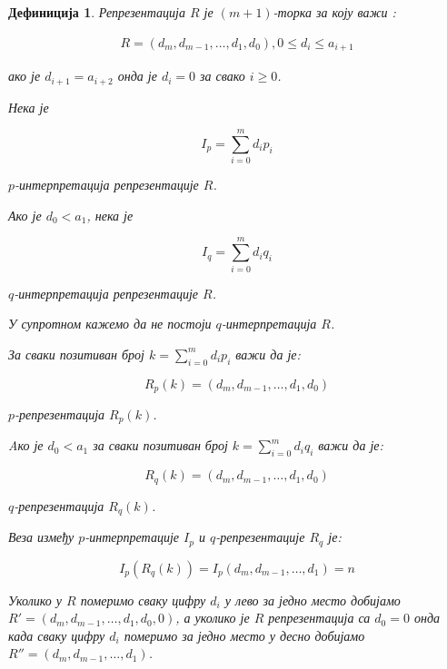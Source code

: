 \documentclass[a4paper]{article}
\newtheorem{definition}{Дефиниција}
\begin{document}
\begin{definition}
	Репрезентација $ R $ је  $ (m+1) $-торка за коју важи :

		\begin{eqnarray}
			R = (d_{m}, d_{m-1}, \dots , d_{1}, d_{0}), 0 \le d_{i} \le a_{i+1}
		\end{eqnarray}

	ако је $ d_{i+1} = a_{i+2} $ онда је $ d_{i} = 0 $ за свако $ i \ge 0 $.

	Нека је 
	
		\begin{displaymath}
			I_{p} = \sum_{i=0}^{m} d_{i}p_{i}
		\end{displaymath} 		
	
	$ p $-интерпретација репрезентације $ R $. 
	
	Ако је $ d_{0} < a_{1} $, нека је 
	
		\begin{displaymath}
			I_{q} = \sum_{i=0}^{m} d_{i}q_{i}
		\end{displaymath}  
	
	$ q $-интерпретација репрезентације $ R $. 
	
	У супротном кажемо да не постоји $ q $-интерпретација $ R $.
	
	За сваки позитиван број $ k = \sum_{i=0}^{m} d_{i}p_{i} $ важи да је: 
	
		\begin{displaymath}
			R_{p}(k) = (d_{m}, d_{m-1}, \dots , d_{1}, d_{0})
		\end{displaymath}
	
	$ p $-репрезентација $ R_{p}(k) $.
	
	Aко је $ d_{0} < a_{1} $ за сваки позитиван број $ k = \sum_{i=0}^{m} d_{i}q_{i} $ важи да је:
	
		\begin{displaymath}
			R_{q}(k) = (d_{m}, d_{m-1}, \dots , d_{1}, d_{0})
		\end{displaymath}
	
	 $ q $-репрезентација $ R_{q}(k) $. 
	
	Веза између $ p $-интерпретације $ I_{p} $ и $ q $-репрезентације $ R_{q} $ је:
	
	\begin{displaymath}
		I_{p}(R_{q}(k)) = I_{p}(d_{m}, d_{m-1}, \dots, d_{1}) = n
	\end{displaymath}
	
	Уколико у $ R $ померимо сваку цифру $ d_{i} $ у лево за једно место добијамо $ R' = (d_{m}, d_{m-1}, \dots , d_{1}, d_{0}, 0) $, а уколико је $ R $ репрезентација са $ d_{0} = 0 $ онда када сваку цифру $ d_{i} $ померимо за једно место у десно добијамо $ R'' = (d_{m}, d_{m-1}, \dots , d_{1}) $. 
\end{definition}
\end{document}
